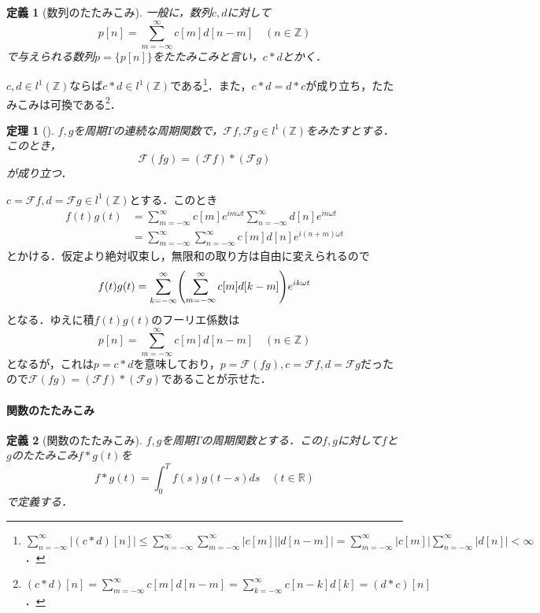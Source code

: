 \documentclass[dvipdfmx,a4j,10pt]{jsarticle}
\makeatletter
\theoremstyle{mystyle1}
\newtheorem{theorem}{定理}[section]
\theoremstyle{mystyle3}
\theoremstyle{mystyle4}
\theoremstyle{mystyle6}
\theoremstyle{mystyle2}
\newtheorem{dfn*}{定義}
\theoremstyle{mystyle5}
\renewenvironment{proof}[1][\proofname]{\par
  \pushQED{\qed}%
  \normalfont
  \topsep6\p@\@plus6\p@ \trivlist
  \item[\hskip\labelsep{\bfseries\sffamily #1}]\ignorespaces
}{%
  \popQED\endtrivlist\@endpefalse
}
\renewcommand\proofname{証明}
\newenvironment{thm}[1][]
{\begin{tcolorbox}[
    enhanced,
    boxrule=0pt,
    arc=0mm,
    frame hidden,
    borderline west={2pt}{-4pt}{red},
    breakable = true
    ]
    \begin{theorem}[#1]
}
{\end{theorem}\end{tcolorbox}}
\makeatother
\begin{document}
\begin{dfn*}[数列のたたみこみ]
	一般に，数列$c,d$に対して
	\begin{equation}\label{eq:2-16}
		p[n]=\sum_{m=-\infty}^\infty c[m]d[n-m]\quad(n\in\mathbb{Z})
	\end{equation}
	で与えられる数列$p=\{p[n]\}$をたたみこみと言い，$c*d$とかく．
\end{dfn*}

$c,d\in l^1(\mathbb{Z})$ならば$c*d\in l^1(\mathbb{Z})$である\footnote{
$\sum_{n=-\infty}^\infty|(c*d)[n]|\leq \sum_{n=-\infty}^\infty \sum_{m=-\infty}^\infty |c[m]||d[n-m]|=\sum_{m=-\infty}^\infty |c[m]|\sum_{n=-\infty}^\infty |d[n]|<\infty$．
}．また，$c*d=d*c$が成り立ち，たたみこみは可換である\footnote{
$(c*d)[n]=\sum_{m=-\infty}^\infty c[m]d[n-m]=\sum_{k=-\infty}^\infty c[n-k]d[k]=(d*c)[n]$．
}．

\begin{thm}\label{thm:2-11}
	$f,g$を周期$T$の連続な周期関数で，$\mathcal{F}f,\mathcal{F}g\in l^1(\mathbb{Z})$をみたすとする．このとき，
	\[
		\mathcal{F}(fg)=(\mathcal{F}f)*(\mathcal{F}g)
	\]
	が成り立つ．
\end{thm}

\begin{proof}
	$c=\mathcal{F}f,d=\mathcal{F}g\in l^1(\mathbb{Z})$とする．このとき
	\[
		\begin{split}
			f(t)g(t)&=\sum_{m=-\infty}^\infty c[m]e^{im\omega t}\sum_{n=-\infty}^\infty d[n]e^{in\omega t} \\
			&=\sum_{m=-\infty}^\infty\sum_{n=-\infty}^\infty c[m]d[n]e^{i(n+m)\omega t}
		\end{split}
	\]
	とかける．仮定より絶対収束し，無限和の取り方は自由に変えられるので
	\[
		f(t)g(t)=\sum_{k=-\infty}^\infty\mleft(\sum_{m=-\infty}^\infty c[m]d[k-m]\mright)e^{ik\omega t}
	\]
	となる．ゆえに積$f(t)g(t)$のフーリエ係数は
	\[
		p[n]=\sum_{m=-\infty}^\infty c[m]d[n-m]\quad(n\in\mathbb{Z})
	\]
	となるが，これは$p=c*d$を意味しており，$p=\mathcal{F}(fg),c=\mathcal{F}f,d=\mathcal{F}g$だったので$\mathcal{F}(fg)=(\mathcal{F}f)*(\mathcal{F}g)$であることが示せた．
\end{proof}

\paragraph{関数のたたみこみ}

\begin{dfn*}[関数のたたみこみ]
	$f,g$を周期$T$の周期関数とする．この$f,g$に対して$f$と$g$のたたみこみ$f*g(t)$を
	\[
		f*g(t)=\int_0^T f(s)g(t-s)ds\quad(t\in\mathbb{R})
	\]
	で定義する．
\end{dfn*}
\end{document}
